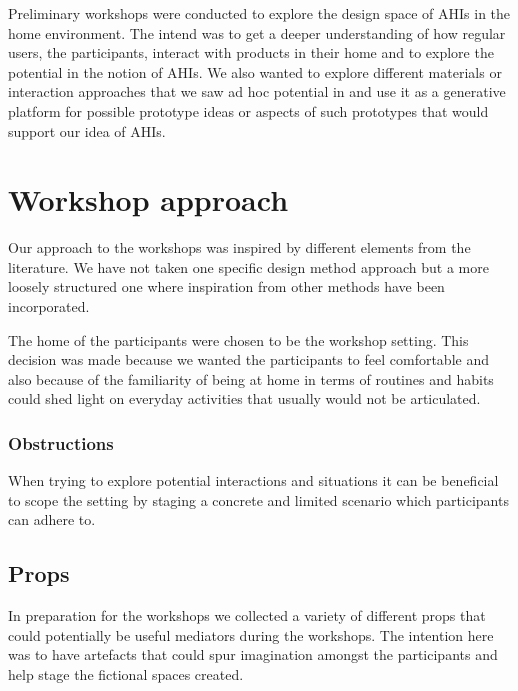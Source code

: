 

Preliminary workshops were conducted to explore the design space of AHIs in the home environment.
The intend was to get a deeper understanding of how regular users, the participants, interact with products in their home and to explore the potential in the notion of AHIs.
We also wanted to explore different materials or interaction approaches that we saw ad hoc potential in and use it as a generative platform for possible prototype ideas or aspects of such prototypes that would support our idea of AHIs.

\section{Workshop approach}
\label{ch:workshops:approach}
Our approach to the workshops was inspired by different elements from the literature. \todo{\dots}
We have not taken one specific design method approach but a more loosely structured one where inspiration from other methods have been incorporated.

The home of the participants were chosen to be the workshop setting.
This decision was made because we wanted the participants to feel comfortable and also because of the familiarity of being at home in terms of routines and habits could shed light on everyday activities that usually would not be articulated.

\subsubsection{Obstructions}
\label{ch:workshops:approach:obstructions}

When trying to explore potential interactions and situations it can be beneficial to scope the setting by staging a concrete and limited scenario which participants can adhere to.







\subsection{Props}
\label{ch:workshops:approach:props}

In preparation for the workshops we collected a variety of different props that could potentially be useful mediators during the workshops.
The intention here was to have artefacts that could spur imagination amongst the participants and help stage the fictional spaces created.

